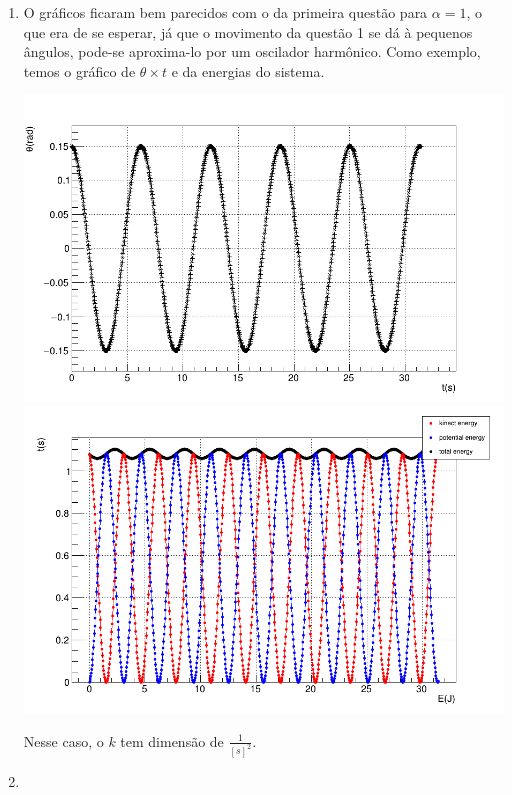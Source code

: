 \documentclass[main.tex]{subfiles}
\begin{document}
\begin{enumerate}[label=\textbf{\alph*)}]
    \item O gráficos ficaram bem parecidos com o da primeira questão para $\alpha = 1$, o que era de se esperar, já que o movimento da questão 1 se dá à pequenos ângulos, pode-se aproxima-lo por um oscilador harmônico.
    Como exemplo, temos o gráfico de $\theta \times t$ e da energias do sistema.
    \begin{center}
        \includegraphics[scale=0.15]{../q3/plots/theta_t_ec.png}
        \includegraphics[scale=0.15]{../q3/plots/Energies_t_ec.png}
    \end{center}
    Nesse caso, o $k$ tem dimensão de $\frac{1}{[s]^2}$.
    \item     
    \begin{center}

\end{center}
\end{enumerate}
\end{document}
